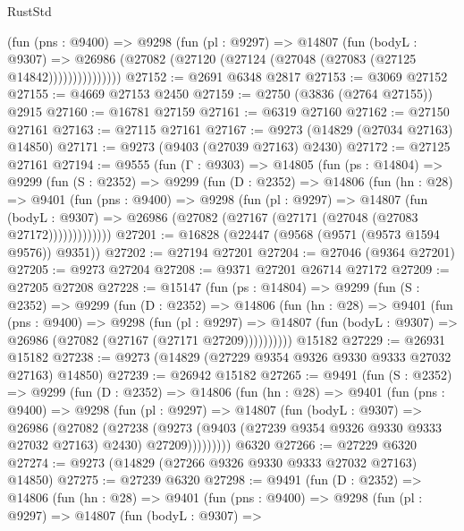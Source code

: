 \begin{lexlean}{RustStd}
\begin{coremodule}
                (fun (pns : @9400) =>
                @9298
                  (fun (pl : @9297) =>
                  @14807
                    (fun (bodyL : @9307) =>
                    @26986 (@27082 (@27120 (@27124 (@27048 (@27083 (@27125 @14842)))))))))))))))
@27152 := @2691 @6348 @2817
@27153 := @3069 @27152
@27155 := @4669 @27153 @2450
@27159 := @2750 (@3836 (@2764 @27155)) @2915
@27160 := @16781 @27159
@27161 := @6319 @27160
@27162 := @27150 @27161
@27163 := @27115 @27161
@27167 := @9273 (@14829 (@27034 @27163) @14850)
@27171 := @9273 (@9403 (@27039 @27163) @2430)
@27172 := @27125 @27161
@27194 := @9555
    (fun (Γ : @9303) =>
    @14805
      (fun (ps : @14804) =>
      @9299
        (fun (S : @2352) =>
        @9299
          (fun (D : @2352) =>
          @14806
            (fun (hn : @28) =>
            @9401
              (fun (pns : @9400) =>
              @9298
                (fun (pl : @9297) =>
                @14807
                  (fun (bodyL : @9307) =>
                  @26986 (@27082 (@27167 (@27171 (@27048 (@27083 @27172)))))))))))))
@27201 := @16828 (@22447 (@9568 (@9571 (@9573 @1594 @9576)) @9351))
@27202 := @27194 @27201
@27204 := @27046 (@9364 @27201)
@27205 := @9273 @27204
@27208 := @9371 @27201 @26714 @27172
@27209 := @27205 @27208
@27228 := @15147
    (fun (ps : @14804) =>
    @9299
      (fun (S : @2352) =>
      @9299
        (fun (D : @2352) =>
        @14806
          (fun (hn : @28) =>
          @9401
            (fun (pns : @9400) =>
            @9298
              (fun (pl : @9297) =>
              @14807 (fun (bodyL : @9307) => @26986 (@27082 (@27167 (@27171 @27209))))))))))
    @15182
@27229 := @26931 @15182
@27238 := @9273 (@14829 (@27229 @9354 @9326 @9330 @9333 @27032 @27163) @14850)
@27239 := @26942 @15182
@27265 := @9491
    (fun (S : @2352) =>
    @9299
      (fun (D : @2352) =>
      @14806
        (fun (hn : @28) =>
        @9401
          (fun (pns : @9400) =>
          @9298
            (fun (pl : @9297) =>
            @14807
              (fun (bodyL : @9307) =>
              @26986
                (@27082
                  (@27238
                    (@9273
                      (@9403 (@27239 @9354 @9326 @9330 @9333 @27032 @27163) @2430)
                      @27209)))))))))
    @6320
@27266 := @27229 @6320
@27274 := @9273 (@14829 (@27266 @9326 @9330 @9333 @27032 @27163) @14850)
@27275 := @27239 @6320
@27298 := @9491
    (fun (D : @2352) =>
    @14806
      (fun (hn : @28) =>
      @9401
        (fun (pns : @9400) =>
        @9298
          (fun (pl : @9297) =>
          @14807
            (fun (bodyL : @9307) =>

\end{coremodule}
\end{lexlean}
